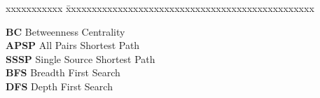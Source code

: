 \abbreviations
\noindent 
\begin{tabbing}
xxxxxxxxxxx \= xxxxxxxxxxxxxxxxxxxxxxxxxxxxxxxxxxxxxxxxxxxxxxxx \kill

\textbf{BC} \> Betweenness Centrality \\
\textbf{APSP} \> All Pairs Shortest Path \\
\textbf{SSSP} \> Single Source Shortest Path \\
\textbf{BFS} \> Breadth First Search \\
\textbf{DFS} \> Depth First Search \\


\end{tabbing}
 